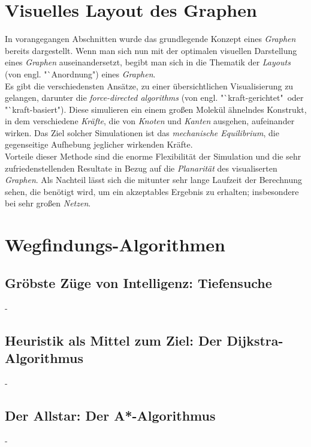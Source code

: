\documentclass[12pt]{article}
\begin{document}
\section{Visuelles Layout des Graphen}
\label{sec:layout}
In vorangegangen Abschnitten wurde das grundlegende Konzept eines \textit{Graphen} bereits dargestellt. Wenn man sich nun mit der optimalen visuellen Darstellung eines \textit{Graphen} auseinandersetzt,
begibt man sich in die Thematik der \textit{Layouts} (von engl. "`Anordnung") eines \textit{Graphen}.\\
Es gibt die verschiedensten Ansätze, zu einer übersichtlichen Visualisierung zu gelangen, darunter die \textit{force-directed algorithms} (von engl. "`kraft-gerichtet"\ oder "`kraft-basiert")\cite{force-directed}. Diese
simulieren ein einem großen Molekül ähnelndes Konstrukt, in dem verschiedene \textit{Kräfte}, die von \textit{Knoten} und \textit{Kanten} ausgehen, aufeinander wirken. Das Ziel solcher Simulationen ist das 
\textit{mechanische Equilibrium}, die gegenseitige Aufhebung jeglicher wirkenden Kräfte.\\
Vorteile dieser Methode sind die enorme Flexibilität der Simulation und die sehr zufriedenstellenden Resultate in Bezug auf die \textit{Planarität} des visualiserten \textit{Graphen}.
Als Nachteil lässt sich die mitunter sehr lange Laufzeit der Berechnung sehen, die benötigt wird, um ein akzeptables Ergebnis zu erhalten; insbesondere bei sehr großen \textit{Netzen}.
\newpage

\section{Wegfindungs-Algorithmen}
\newpage

\subsection{Gröbste Züge von Intelligenz: Tiefensuche}
\newpage
-
\newpage

\subsection{Heuristik als Mittel zum Ziel: Der Dijkstra-Algorithmus}
\newpage
-
\newpage

\subsection{Der Allstar: Der A*-Algorithmus}
\newpage
-
\newpage
\end{document}

